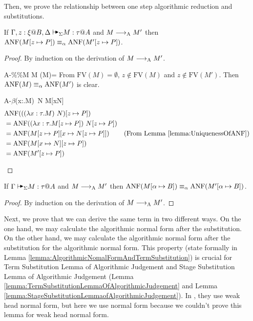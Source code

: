 Then, we prove the relationship between one step algorithmic reduction and substitutions.

\begin{lemma}
    \label{lemma:AlgorithmicReductionAndTermSubstitution}
    If \( \G, z:\xi@B, \D \AVS M : \tau @ A \) and \( M \longrightarrow_{\text{A}} M' \) then
    \( \text{ANF}(M[z\mapsto P]) \equiv_\alpha \text{ANF}(M'[z\mapsto P]) \).
\end{lemma}

\begin{proof}
    By induction on the derivation of \( M \longrightarrow_{\text{A}} M' \).
    \begin{rneqncase}{\textsc{A-\%}}{\%M \RA M  (M)=\emptyset}
        From \( \text{FV}(M)=\emptyset \), \( z \notin \text{FV}(M) \) and \( z \notin \text{FV}(M') \).
        Then \( \text{ANF}(M) \equiv_\alpha \text{ANF}(M') \) is clear.
    \end{rneqncase}

    \begin{rneqncase}{\textsc{A-$\beta$}}{(\lambda x:\tau.M)\ N \RA M[x\mapsto N]}
        \begin{align*}
            & \text{ANF}(((\lambda x:\tau.M)\ N)[z \mapsto P]) \\
            & = \text{ANF}((\lambda x:\tau.M[z \mapsto P])\ N[z \mapsto P]) \\
            & = \text{ANF}(M[z \mapsto P][x \mapsto N[z \mapsto P]]) & (\text{From Lemma } \ref{lemma:UniquenessOfANF}) \\
            & = \text{ANF}(M[x \mapsto N][z \mapsto P]) \\
            & = \text{ANF}(M'[z \mapsto P])
        \end{align*}
    \end{rneqncase}
\end{proof}

\begin{lemma}
    \label{lemma:AlgorithmicReductionAndStageSubstitution}
    If \( \G \AVS M : \tau @ A \) and \( M \longrightarrow_{\text{A}} M' \) then
    \( \text{ANF}(M[\alpha \mapsto B]) \equiv_\alpha \text{ANF}(M'[\alpha \mapsto B]) \).
\end{lemma}

\begin{proof}
    By induction on the derivation of \( M \longrightarrow_{\text{A}} M' \).
\end{proof}

Next, we prove that we can derive the same term in two different ways. On the
one hand, we may calculate the algorithmic normal form after the substitution.
On the other hand, we may calculate the algorithmic normal form after the
substitution for the algorithmic normal form. This property (state formally in
Lemma \ref{lemma:AlgorithmicNomalFormAndTermSubstitution}) is crucial for Term
Substitution Lemma of Algorithmic Judgement and Stage Substitution Lemma of
Algorithmic Judgement (Lemma
\ref{lemma:TermSubstitutionLemmaOfAlgorithmicJudgement} and Lemma
\ref{lemma:StageSubstitutionLemmaofAlgorithmicJudgement}). In \cite{attapl},
they use weak head normal form, but here we use normal form because we couldn't
prove this lemma for weak head normal form.


